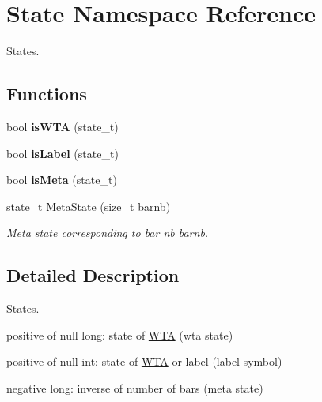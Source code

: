 \hypertarget{namespaceState}{}\section{State Namespace Reference}
\label{namespaceState}


States.  


\subsection*{Functions}
\begin{DoxyCompactItemize}
\item 
bool {\bfseries is\+W\+TA} (state\+\_\+t)
\item 
bool {\bfseries is\+Label} (state\+\_\+t)
\item 
bool {\bfseries is\+Meta} (state\+\_\+t)
\item 
state\+\_\+t \mbox{\hyperlink{group__schemata_ga0ffeaad4a7482bc302dce44a23a85a6e}{Meta\+State}} (size\+\_\+t barnb)
\begin{DoxyCompactList}\small\item\em Meta state corresponding to bar nb barnb. \end{DoxyCompactList}\end{DoxyCompactItemize}


\subsection{Detailed Description}
States. 


\begin{DoxyItemize}
\item positive of null long\+: state of \mbox{\hyperlink{classWTA}{W\+TA}} (wta state)
\item positive of null int\+: state of \mbox{\hyperlink{classWTA}{W\+TA}} or label (label symbol)
\item negative long\+: inverse of number of bars (meta state) 
\end{DoxyItemize}